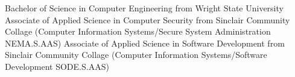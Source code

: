 %
%
%

 {\faGraduationCap}

\begin{scholarship}
					{Bachelor of Science in Computer Engineering from Wright State University} 
					{Associate of Applied Science in Computer Security from Sinclair Community Collage (Computer Information Systems/Secure System Administration NEMA.S.AAS)}
					{Associate of Applied Science in Software Development from Sinclair Community Collage (Computer Information Systems/Software Development SODE.S.AAS)}
\end{scholarship}